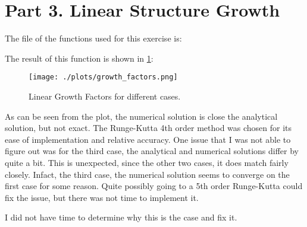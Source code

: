 \section{Part 3. Linear Structure Growth}

The file of the functions used for this exercise is:



The result of this function is shown in \ref{fig:lgf}:

\begin{figure}[h!]
  \centering
  \texttt{[image: ./plots/growth\_factors.png]}
  \caption{Linear Growth Factors for different cases.}
  \label{fig:lgf}
\end{figure}

As can be seen from the plot, the numerical solution is close the analytical solution, but not exact.
The Runge-Kutta 4th order method was chosen for its ease of implementation and relative accuracy.
One issue that I was not able to figure out was for the third case, the analytical and numerical solutions differ by
quite a bit. This is unexpected, since the other two cases, it does match fairly closely. Infact, the third case, the numerical
solution seems to converge on the first case for some reason. Quite possibly going to a 5th order Runge-Kutta could fix the issue,
but there was not time to implement it.

I did not have time to determine why this is the case and fix it.